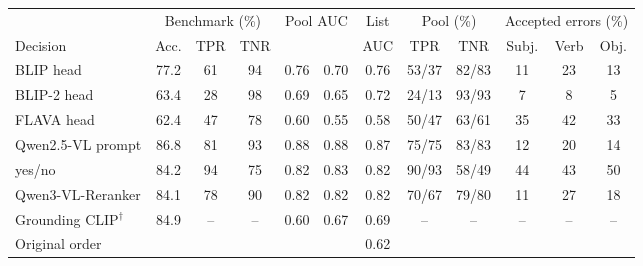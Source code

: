 \begin{tabular}{l ccc cc c cc ccc}
\toprule
& \multicolumn{3}{c}{Benchmark (\%)} & \multicolumn{2}{c}{Pool AUC} & List & \multicolumn{2}{c}{Pool (\%)} & \multicolumn{3}{c}{Accepted errors (\%)}\\
\cmidrule(lr){2-4}\cmidrule(lr){5-6}\cmidrule(lr){8-9}\cmidrule(lr){10-12}
Decision & Acc. & TPR & TNR & \ttoi{} & \itot{} & AUC & TPR & TNR & Subj. & Verb & Obj.\\
\midrule
BLIP head & 77.2 & 61 & 94 & 0.76 & 0.70 & 0.76 & 53/37 & 82/83 & 11 & 23 & 13 \\
BLIP-2 head & 63.4 & 28 & 98 & 0.69 & 0.65 & 0.72 & 24/13 & 93/93 & 7 & 8 & 5 \\
FLAVA head & 62.4 & 47 & 78 & 0.60 & 0.55 & 0.58 & 50/47 & 63/61 & 35 & 42 & 33 \\
Qwen2.5-VL prompt & 86.8 & 81 & 93 & 0.88 & 0.88 & 0.87 & 75/75 & 83/83 & 12 & 20 & 14 \\
\qemb{} yes/no & 84.2 & 94 & 75 & 0.82 & 0.83 & 0.82 & 90/93 & 58/49 & 44 & 43 & 50 \\
Qwen3-VL-Reranker & 84.1 & 78 & 90 & 0.82 & 0.82 & 0.82 & 70/67 & 79/80 & 11 & 27 & 18 \\
Grounding CLIP$^{\dagger}$ & 84.9 & -- & -- & 0.60 & 0.67 & 0.69 & -- & -- & -- & -- & -- \\
\midrule
Original order &  &  &  &  &  & 0.62 &  &  &  &  &  \\
\bottomrule
\end{tabular}
